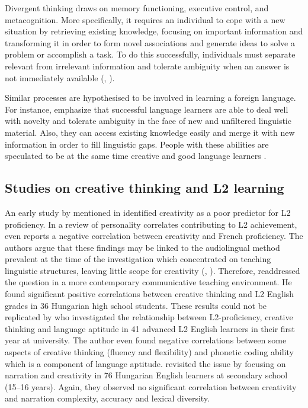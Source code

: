 \documentclass[output=paper]{langsci/langscibook}
\begin{document}
Divergent thinking draws on memory functioning, executive control, and metacognition. More specifically, it requires an individual to cope with a new situation by retrieving existing knowledge, focusing on important information and transforming it in order to form novel associations and generate ideas to solve a problem or accomplish a task. To do this successfully, individuals must separate relevant from irrelevant information and tolerate ambiguity when an answer is not immediately available (\citealt{FinkeEtAl1992}, \citealt{Cropley2006}).

Similar processes are hypothesised to be involved in learning a foreign language. For instance, \citet{GrigorenkoEtAl2000} emphasize that successful language learners are able to deal well with novelty and tolerate ambiguity in the face of new and unfiltered linguistic material. Also, they can access existing knowledge easily and merge it with new information in order to fill linguistic gaps. People with these abilities are speculated to be at the same time creative and good language learners \citep{Kharkhurin2012}.

\subsection{Studies on creative thinking and L2 learning}\label{sec:06:2.2}

An early study by \citet{Carroll1964} mentioned in \citet{Otto1998} identified creativity as a poor predictor for L2 proficiency. In a review of personality correlates contributing to L2 achievement, \citet{Gardner1990} even reports a negative correlation between creativity and French proficiency. The authors argue that these findings may be linked to the audiolingual method prevalent at the time of the investigation which concentrated on teaching linguistic structures, leaving little scope for creativity (\citealt{Otto1998}, \citealt{Gardner1990}). Therefore, \citet{Otto1998} readdressed the question in a more contemporary communicative teaching environment. He found significant positive correlations between creative thinking and L2 English grades in 36 Hungarian high school students. These results could not be replicated by \citet{Albert2006} who investigated the relationship between L2-proficiency, creative thinking and language aptitude in 41 advanced L2 English learners in their first year at university. The author even found negative correlations between some aspects of creative thinking (fluency and flexibility) and phonetic coding ability which is a component of language aptitude. \citet{AlbertKormos2011} revisited the issue by focusing on narration and creativity in 76 Hungarian English learners at secondary school (15--16 years). Again, they observed no significant correlation between creativity and narration complexity, accuracy and lexical diversity.
\end{document}
